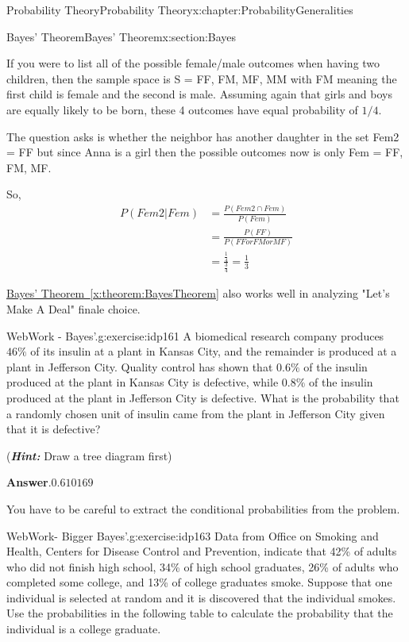 \documentclass[oneside,10pt,]{book}
\newcommand{\blocktitlefont}{\relax}
\newcommand{\xreffont}{\relax}
\newcommand{\alert}[1]{\textbf{\textit{#1}}}
\numberwithin{equation}{section}
\begin{document}
\begin{chapterptx}{Probability Theory}{}{Probability Theory}{}{}{x:chapter:ProbabilityGeneralities}
\begin{sectionptx}{Bayes' Theorem}{}{Bayes' Theorem}{}{}{x:section:Bayes}
\par
If you were to list all of the possible female\slash{}male outcomes when having two children, then the sample space is S = \textbraceleft{}FF, FM, MF, MM\textbraceright{} with FM meaning the first child is female and the second is male. Assuming again that girls and boys are equally likely to be born, these 4 outcomes have equal probability of \(1/4\).%
\par
The question asks is whether the neighbor has another daughter in the set Fem2 = \textbraceleft{}FF\textbraceright{} but since Anna is a girl then the possible outcomes now is only Fem = \textbraceleft{}FF, FM, MF\textbraceright{}.%
\par
So,%
\begin{align*}
P(Fem2|Fem) & = \frac{P(Fem2 \cap Fem)}{P(Fem)} \\
& = \frac{P(FF)}{P(FF or FM or MF)}\\
& = \frac{\frac{1}{4}}{\frac{3}{4}} = \frac{1}{3}
\end{align*}
%
\par
\hyperref[x:theorem:BayesTheorem]{Bayes' Theorem~{\xreffont\ref{x:theorem:BayesTheorem}}} also works well in analyzing "Let's Make A Deal" finale choice.%
\begin{inlineexercise}{WebWork - Bayes'.}{g:exercise:idp161}%
A biomedical research company produces \(46 \%\) of its insulin at a plant in Kansas City, and the remainder is produced at a plant in Jefferson City.  Quality control has shown that \(0.6 \%\) of the insulin produced at the plant in Kansas City is defective, while \(0.8 \%\) of the insulin produced at the plant in Jefferson City is defective.  What is the probability that a randomly chosen unit of insulin came from the plant in Jefferson City given that it is defective?%
\par
(\alert{Hint:} Draw a tree diagram first)%
\par\smallskip%
\noindent\textbf{\blocktitlefont Answer}.\hypertarget{g:answer:idp162}{}\quad{}\(0.610169\)%
\par\medskip\noindent You have to be careful to extract the conditional probabilities from the problem.%
\par
\end{inlineexercise}%
\begin{inlineexercise}{WebWork- Bigger Bayes'.}{g:exercise:idp163}%
Data from Office on Smoking and Health, Centers for Disease Control and Prevention, indicate that 42\% of adults who did not finish high school, 34\% of high school graduates, 26\% of adults who completed some college, and 13\% of college graduates smoke.  Suppose that one individual is selected at random and it is discovered that the individual smokes.  Use the probabilities in the following table to calculate the probability that the individual is a college graduate.%

\end{inlineexercise}
\end{sectionptx}
\end{chapterptx}
\end{document}
